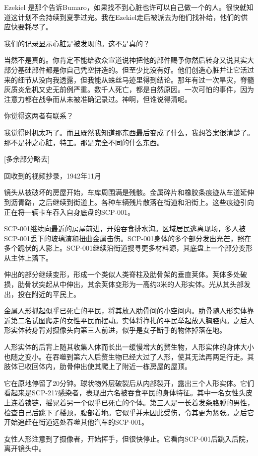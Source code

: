 \begin{scpbox}
Ezekiel 是那个告诉Bumaro，如果找不到心脏也许可以自己做一个的人。很快就知道这计划不会持续到夏季过完。我在Ezekiel走后被派去为他们找补给，他们的供应快要耗尽了。

我们的记录显示心脏是被发现的。这不是真的？

当然不是真的。你肯定不能给教众宣道说神把他的部件赐予你然后转身又说其实大部分基础部件都是你自己凭空拼造的。但至少比没有好。他们创造心脏并让它活过来的细节从没向我透露，但我能从蛛丝马迹里得到结论。那年有过一次旱灾，脊髓灰质炎危机又史无前例严重。数千人死亡，都是自然原因。一次可怕的事件，因为注意力都在战争而从未被准确记录过。神啊，但谁说得清呢。

你觉得这两者有联系？

我觉得时机太巧了。而且既然我知道那东西最后变成了什么，我想答案很清楚了。那不是神之心脏，特工。那是完全不同的什么东西。

[多余部分略去]

\end{scpbox}

回收到的视频抄录，1942年11月

\begin{scpbox}


镜头从被破坏的房屋开始，车库周围满是残骸。金属碎片和橡胶条痕迹从车道延伸到沥青路，之后继续到街道上。各种车辆残片散落在街道和沿街上。这些痕迹引向正在将一辆卡车吞入自身底盘的SCP-001。

SCP-001继续向最近的房屋前进，开始吞食排水沟。区域居民逃离现场，多人被SCP-001丢下的玻璃渣和扭曲金属击伤。SCP-001身体的多个部分发出光芒，照在多个跪伏的人影上。SCP-001继续沿街道搜寻更多材料源，其底盘上一个部分变形从主体上落下。

伸出的部分继续变形，形成一个类似人类脊柱及肋骨架的垂直荚体。荚体多处破损，肋骨状突起从中伸出，其余荚体变形为一高约3米的人形实体。光从其头部发出，投在附近的平民上。

金属人形抓起似乎已死亡的平民，将其放入肋骨间的小空间内。肋骨随人形实体靠近第二名试图爬走的女性平民而摆动。实体将挣扎的平民举起放入胸腔内。之后人形实体转身背对摄像头向第三人前进，似乎是女子断手的物体掉落在地。

人形实体的后背上随其收集人体而长出一缓慢增大的赘生物，人形实体的身体大小也随之变小。在吞噬到第六人后赘生物已经大过了人形，使其无法再两足行走。其肢体已收回体内，肋骨伸出使其爬上了附近一栋房屋的屋顶。

它在原地停留了20分钟。球状物外层破裂后从内部裂开，露出三个人形实体。它们看起来是SCP-217感染者，表现出六名被吞食平民的身体特征。其中一名女性头皮上连着锁链，摇晃着另一个似乎已死亡的个体。第三人是一长着发条胳膊的男性，检查自己后跳下了楼顶，腹部着地。它似乎并未因此受伤，令其更为紧张。之后它开始追赶在街道远处吞噬其他汽车的SCP-001。

女性人形注意到了摄像者，开始挥手，但很快停止。它看向SCP-001后跳入后院，离开镜头中。

\end{scpbox}

